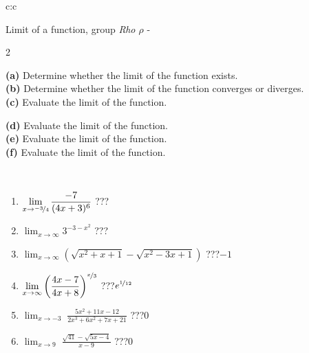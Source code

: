 \documentclass[10pt]{report}
\begin{document}
\newpage
\thispagestyle{empty}
\begin{tabular}{c:c}
\begin{minipage}[c][104.5mm][t]{0.5\linewidth}
\begin{center}
\vspace{5mm}
{\huge Limit of a function, group \textit{Rho $\rho$} -}\\[5mm]
\begin{minipage}{0.95\linewidth}
\begin{center}
{\small \begin{multicols}{2} \raggedright
\textbf{(a)} Determine whether the limit of the function exists. \\[1mm]
\textbf{(b)} Determine whether the limit of the function converges or diverges. \\[1mm]
\textbf{(c)} Evaluate the limit of the function. \par \columnbreak
\textbf{(d)} Evaluate the limit of the function. \\[1mm]
\textbf{(e)} Evaluate the limit of the function. \\[1mm]
\textbf{(f)} Evaluate the limit of the function. \\[1mm]
\end{multicols}
}
\end{center}
\end{minipage}
\\[1mm]
\begin{minipage}{0.79\linewidth}
\begin{center}
\begin{varwidth}{\linewidth}
\setlength{\itemsep}{0pt}
\begin{enumerate}
\normalsize
\item $\displaystyle\lim_{x\to\nicefrac{-3}{4}}{\frac{-7}{(4x+3)^{6}}}$\quad \dotfill\; ???\;\dotfill \quad {}
\item $\displaystyle\lim_{x\to\infty}{3^{-3-x^2}}$\quad \dotfill\; ???\;\dotfill \quad {}
\item $\displaystyle\lim_{x\to\infty}{\left(\sqrt{x^2+x+1} - \sqrt{x^2-3x+1}\right)}$\quad \dotfill\; ???\;\dotfill \quad $-1$
\item $\displaystyle\lim_{x\to\infty}{\left( \frac{4x-7}{4x+8} \right)^{\nicefrac{x}{3}}}$\quad \dotfill\; ???\;\dotfill \quad $e^{\nicefrac{1}{12}}$
\item $\displaystyle\lim_{x\to -3}{\;\frac{5x^2+11x-12}{2x^3+6x^2+7x+21}}$\quad \dotfill\; ???\;\dotfill \quad $0$
\item $\displaystyle\lim_{x\to 9}{\;\frac{\sqrt{41}-\sqrt{5x-4}}{x-9}}$\quad \dotfill\; ???\;\dotfill \quad $0$

\end{enumerate}
\end{varwidth}
\end{center}
\end{minipage}
\end{center}
\end{minipage}
\end{tabular}
\end{document}
